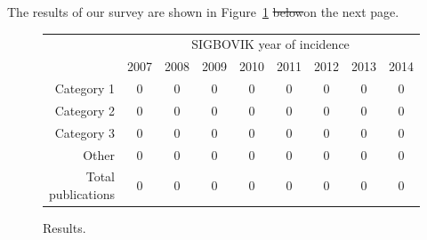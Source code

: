 \documentclass[12pt]{article}
\begin{document}
The results of our survey are shown in Figure~\ref{fig:results} \sout{below}on the next page.

\begin{figure}[h]
\begin{center}
\begin{tabular}{r|c|c|c|c|c|c|c|c|}
& \multicolumn{8}{c|}{SIGBOVIK year of incidence} \\
& 2007 & 2008 & 2009 & 2010 & 2011 & 2012 & 2013 & 2014 \\
\hline
\hline
Category 1 & 0 & 0 & 0 & 0 & 0 & 0 & 0 & 0 \\
\hline
Category 2 & 0 & 0 & 0 & 0 & 0 & 0 & 0 & 0 \\
\hline
Category 3 & 0 & 0 & 0 & 0 & 0 & 0 & 0 & 0 \\
\hline
Other & 0 & 0 & 0 & 0 & 0 & 0 & 0 & 0 \\
\hline
\hline
Total publications & 0 & 0 & 0 & 0 & 0 & 0 & 0 & 0 \\

\end{tabular}
\end{center}
\caption{Results.}
\label{fig:results}
\end{figure}
\end{document}
